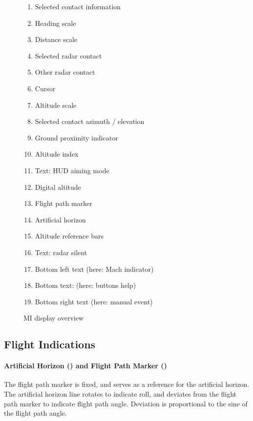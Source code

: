 \begin{figure}[!ht]
  \begin{multicols}{2}
    \begin{enumerate}[nosep]
      \item \label{item:tgt-info} Selected contact information
      \item \label{item:heading} Heading scale
      \item \label{item:distance} Distance scale
      \item \label{item:selected} Selected radar contact
      \item \label{item:contact} Other radar contact
      \item \label{item:cursor} Cursor
      \item \label{item:altitude} Altitude scale
      \item \label{item:azimuth} Selected contact azimuth / elevation
      \item \label{item:ground} Ground proximity indicator
      \item \label{item:alt-index} Altitude index
      \item \label{item:text-sikt} Text: HUD aiming mode
      \item \label{item:dig-alt} Digital altitude
      \item \label{item:fpv} Flight path marker
      \item \label{item:horizon} Artificial horizon
      \item \label{item:alt-bars} Altitude reference bars
      \item \label{item:text-tyst} Text: radar silent
      \item \label{item:text-mach} Bottom left text (here: Mach indicator)
      \item \label{item:text-help} Bottom text: (here: buttons help)
      \item \label{item:text-mreg} Bottom right text (here: manual event)
    \end{enumerate}
  \end{multicols}

  \caption{MI display overview}
  \label{fig:mi-screen}
\end{figure}

\subsection{Flight Indications}
\paragraph{%
  Artificial Horizon ()
  and Flight Path Marker ()
}
The flight path marker is fixed, and serves as a reference for the artificial horizon.
The artificial horizon line rotates to indicate roll,
and deviates from the flight path marker to indicate flight path angle.
Deviation is proportional to the sine of the flight path angle.

